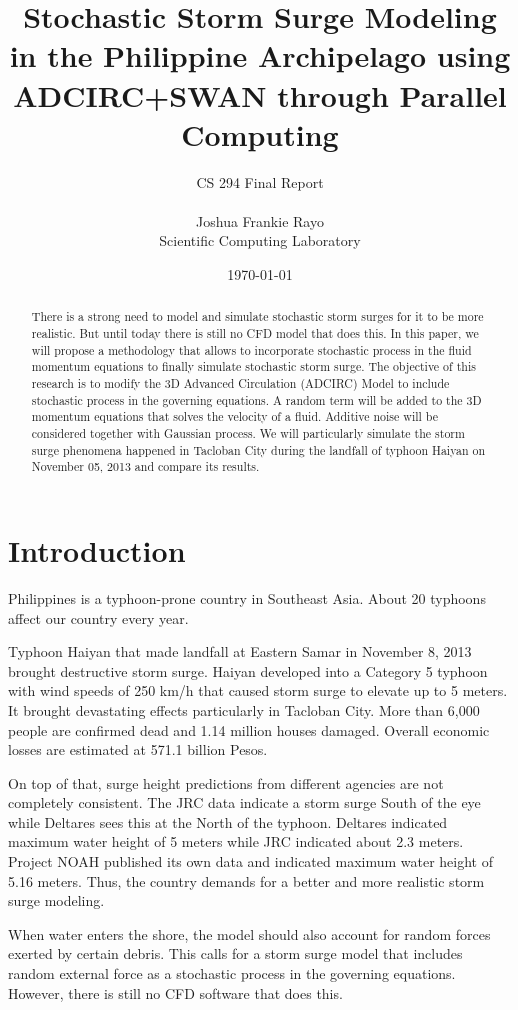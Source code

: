 \documentclass[a4paper, 10pt]{article}
\title{Stochastic Storm Surge Modeling in the Philippine Archipelago using ADCIRC+SWAN through Parallel Computing}
\author{CS 294 Final Report\\\\ Joshua Frankie Rayo\\ Scientific Computing Laboratory}
\date{\today}
\begin{document}
	\maketitle
	
	\begin{abstract}
		There is a strong need to model and simulate stochastic storm surges for it to be more realistic. But until today there is still no CFD model that does this. In this paper, we will propose a methodology that allows to incorporate stochastic process in the fluid momentum equations to finally simulate stochastic storm surge. The objective of this research is to modify the 3D Advanced Circulation (ADCIRC) Model to include stochastic process in the governing equations. A random term will be added to the 3D momentum equations that solves the velocity of a fluid. Additive noise will be considered together with Gaussian process. We will particularly simulate the storm surge phenomena happened in Tacloban City during the landfall of typhoon Haiyan on November 05, 2013 and compare its results.
	\end{abstract}
	
	
	\section{Introduction}
	Philippines is a typhoon-prone country in Southeast Asia. About 20 typhoons affect our country every year.
	
	Typhoon Haiyan that made landfall at Eastern Samar in November 8, 2013 brought destructive storm surge. Haiyan developed into a Category 5 typhoon with wind speeds of 250 km/h that caused storm surge to elevate up to 5 meters. It brought devastating effects particularly in Tacloban City. More than 6,000 people are confirmed dead and 1.14 million houses damaged. Overall economic losses are estimated at 571.1 billion Pesos.
	
	On top of that, surge height predictions from different agencies are not completely consistent. The JRC data indicate a storm surge South of the eye while Deltares sees this at the North of the typhoon. Deltares indicated maximum water height of 5 meters while JRC indicated about 2.3 meters. Project NOAH published its own data and indicated maximum water height of 5.16 meters. Thus, the country demands for a better and more realistic storm surge modeling.
	
	When water enters the shore, the model should also account for random forces exerted by certain debris. This calls for a storm surge model that includes random external force as a stochastic process in the governing equations. However, there is still no CFD software that does this.
	
\end{document}
